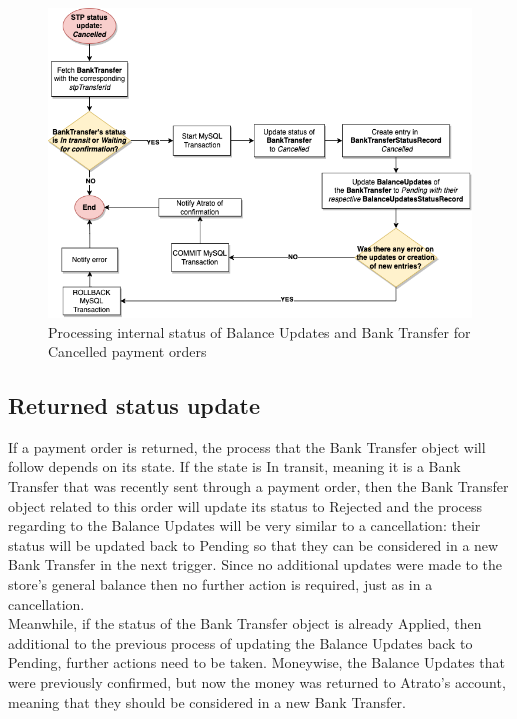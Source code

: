 \begin{figure} [h]
    \centering
    \includegraphics[scale = 0.4]{assets/diagrams/CancelledStatusUpdate.png}
    \caption{Processing internal status of Balance Updates and Bank Transfer for Cancelled payment orders}\label{fig:cancelled_status_update}
\end{figure}

\subsection{Returned status update}

If a payment order is returned, the process that the Bank Transfer object will follow depends on its state. If the state is In transit, meaning it is a Bank Transfer that was recently sent through a payment order, then the Bank Transfer object related to this order will update its status to Rejected and the process regarding to the Balance Updates will be very similar to a cancellation: their status will be updated back to Pending so that they can be considered in a new Bank Transfer in the next trigger. Since no additional updates were made to the store’s general balance then no further action is required, just as in a cancellation.\\

Meanwhile, if the status of the Bank Transfer object is already Applied, then additional to the previous process of updating the Balance Updates back to Pending, further actions need to be taken. Moneywise, the Balance Updates that were previously confirmed, but now the money was returned to Atrato’s account, meaning that they should be considered in a new Bank Transfer.\\

